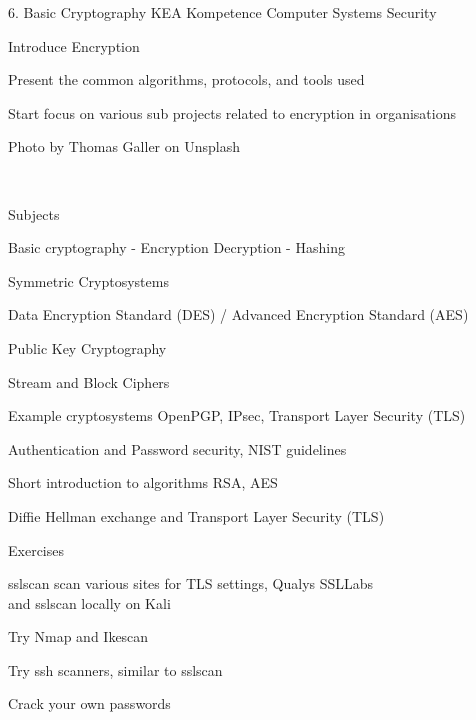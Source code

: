 \documentclass[Screen16to9,17pt]{foils}
\begin{document}
\mytitlepage
{6. Basic Cryptography}
{KEA Kompetence Computer Systems Security \the\year}




 
\begin{list2}
\item Introduce Encryption
\item Present the common algorithms, protocols, and tools used
\item Start focus on various sub projects related to encryption in organisations
\end{list2}

{\small Photo by Thomas Galler on Unsplash}


{~}

\begin{list1}
\item Subjects
\begin{list2}
\item Basic cryptography - Encryption Decryption - Hashing
\item Symmetric Cryptosystems
\item Data Encryption Standard (DES) / Advanced Encryption Standard (AES)
\item Public Key Cryptography
\item Stream and Block Ciphers
\item Example cryptosystems OpenPGP, IPsec, Transport Layer Security (TLS)
\item Authentication and Password security, NIST guidelines
\item Short introduction to algorithms RSA, AES
\item Diffie Hellman exchange and Transport Layer Security (TLS)
\end{list2}
\end{list1}

\begin{list1}
\item Exercises
\begin{list2}
\item sslscan scan various sites for TLS settings, Qualys SSLLabs\\
 and sslscan locally on Kali
\item Try Nmap and Ikescan
\item Try ssh scanners, similar to sslscan
\item Crack your own passwords
\end{list2}
\end{list1}
\end{document}
